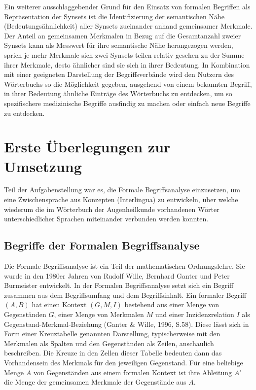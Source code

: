 \documentclass[pagesize,DIV=calc,12pt,draft]{scrreprt}
\begin{document}
Ein weiterer ausschlaggebender Grund für den Einsatz von formalen Begriffen als Repräsentation der Synsets ist die Identifizierung der semantischen Nähe (Bedeutungsähnlichkeit) aller Synsets zueinander anhand gemeinsamer Merkmale. 
Der Anteil an gemeinsamen Merkmalen in Bezug auf die Gesamtanzahl zweier Synsets kann als Messwert für ihre semantische Nähe herangezogen werden, sprich je mehr Merkmale sich zwei Synsets teilen relativ gesehen zu der Summe ihrer Merkmale, desto ähnlicher sind sie sich in ihrer Bedeutung. 
In Kombination mit einer geeigneten Darstellung der Begriffsverbände wird den Nutzern des Wörterbuchs so die Möglichkeit gegeben, ausgehend von einem bekannten Begriff, in ihrer Bedeutung ähnliche Einträge des Wörterbuchs zu entdecken, um so spezifischere medizinische Begriffe ausfindig zu machen oder einfach neue Begriffe zu entdecken. 

\section{Erste Überlegungen zur Umsetzung}

Teil der Aufgabenstellung war es, die Formale Begriffsanalyse einzusetzen, um eine Zwischensprache aus Konzepten (Interlingua) zu entwickeln, über welche wiederum die im Wörterbuch der Augenheilkunde vorhandenen Wörter unterschiedlicher Sprachen miteinander verbunden werden konnten.

\subsection{Begriffe der Formalen Begriffsanalyse}
\label{subsec:marker}

Die Formale Begriffsanalyse ist ein Teil der mathematischen Ordnungslehre. 
Sie wurde in den 1980er Jahren von Rudolf Wille, Bernhard Ganter und Peter Burmeister entwickelt. 
In der Formalen Begriffsanalyse setzt sich ein Begriff zusammen aus dem Begriffsumfang und dem Begriffsinhalt. 
Ein formaler Begriff $(A,B)$ hat einen Kontext $(G,M,I)$ bestehend aus einer Menge von Gegenständen $G$, einer Menge von Merkmalen $M$ und einer Inzidenzrelation $I$ als Gegenstand-Merkmal-Beziehung (Ganter \& Wille, 1996, S.58). 
Diese lässt sich in Form einer Kreuztabelle genannten Darstellung, typischerweise mit den Merkmalen als Spalten und den Gegenständen als Zeilen, anschaulich beschreiben. 
Die Kreuze in den Zellen dieser Tabelle bedeuten dann das Vorhandensein des Merkmals für den jeweiligen Gegenstand. 
Für eine beliebige Menge $A$ von Gegenständen aus einem formalen Kontext ist ihre Ableitung $A'$ die Menge der gemeinsamen Merkmale der Gegenstände aus $A$. 
\end{document}
